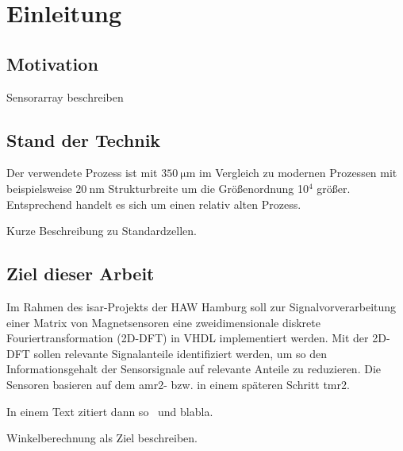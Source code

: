 \chapter{Einleitung}
 \section{Motivation}
Sensorarray beschreiben

\section{Stand der Technik}
Der verwendete Prozess ist mit $\SI{350}{\um}$ im Vergleich zu modernen Prozessen mit beispielsweise $\SI{20}{\nm}$ Strukturbreite um die Größenordnung 10$^4$ größer. Entsprechend handelt es 
sich um einen relativ alten Prozess.

Kurze Beschreibung zu Standardzellen.


\section{Ziel dieser Arbeit}
Im Rahmen des \gls{isar}-Projekts der HAW Hamburg soll zur Signalvorverarbeitung einer Matrix von Magnetsensoren  eine 
zweidimensionale diskrete Fouriertransformation (2D-DFT) in VHDL implementiert werden. Mit der 
2D-DFT sollen relevante Signalanteile identifiziert werden, um so den Informationsgehalt der Sensorsignale auf relevante Anteile zu reduzieren. Die Sensoren basieren auf 
dem \gls{amr2}- bzw. in einem späteren Schritt \gls{tmr2}.

In einem Text zitiert dann so~\autocite[10-20]{krey2015systemarchitektur} und blabla.

Winkelberechnung als Ziel beschreiben.